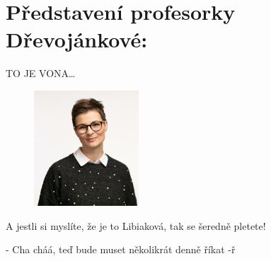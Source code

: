 \documentclass[twoside, 11pt]{article}
\begin{document}
\section*{Představení profesorky Dřevojánkové:}
TO JE VONA\dots \\
\begin{figure}
    \vspace*{-52pt}
    \includegraphics[width=0.35\textwidth]{libiak}
\end{figure}

A jestli si myslíte, že je to Libiaková, tak se šeredně pletete!
\vfill
\begin{flushright}
    - Cha cháá, teď bude muset několikrát denně říkat -ř  
\end{flushright}
\end{document}
